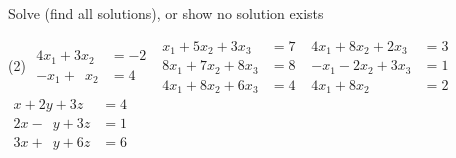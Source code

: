 
\begin{exercise}
Solve (find all solutions), or show no solution exists
\begin{tasks}(2)
\task
$\begin{aligned}
 4x_1+3x_2 & = -2 \\
 -x_1+\phantom{3} x_2 & = 4
\end{aligned}$
\task
$\begin{aligned}
  x_1+5x_2+3x_3 & = 7 \\
 8x_1+7x_2+8x_3 & = 8 \\
 4x_1+8x_2+6x_3 & = 4
\end{aligned}$
\task
$\begin{aligned}
 4x_1+8x_2+2x_3 & = 3 \\
 -x_1-2x_2+3x_3 & = 1 \\
 4x_1+8x_2 \phantom{{}+3x_3} & = 2
\end{aligned}$
\task
$\begin{aligned}
  x+2y+3z & = 4 \\
2  x-\phantom{2} y+3z & = 1 \\
3  x+\phantom{2} y+6z & = 6
\end{aligned}$
\end{tasks}
\end{exercise}

